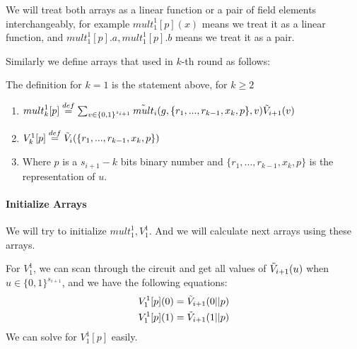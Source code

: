 {	We will treat both arrays as a linear function or a pair of field elements interchangeably, for example ${mult}_1^1[p](x)$ means we treat it as a linear function, and ${mult}_1^1[p].a, {mult}_1^1[p].b$ means we treat it as a pair.
	
	Similarly we define arrays that used in $k$-th round as follows:
	\begin{definition}
		
		The definition for $k=1$ is the statement above, for $k\ge 2$
		\begin{enumerate}
			\item ${mult}_k^1[p]\overset{def}{=}\sum_{v\in \{0, 1\}^{s_{i+1}}}\tilde{mult}_i(g, \{r_1, ..., r_{k-1}, x_k, p\}, v)\tilde{V}_{i+1}(v)$
			\item ${V}_k^1[p]\overset{def}{=}\tilde{V}_i(\{r_1, ..., r_{k-1}, x_k, p\})$
			\item Where $p$ is a $s_{i+1}-k$ bits binary number and $\{r_1, ..., r_{k-1}, x_k, p\}$ is the representation of $u$.
		\end{enumerate}
	\end{definition}
	
	\paragraph{Initialize Arrays}
	We will try to initialize ${mult}_1^1, {V}_1^1$. And we will calculate next arrays using these arrays.
	
	For ${V}_1^1$, we can scan through the circuit and get all values of $\tilde{V}_{i+1}(u)$ when $u \in \{0, 1\}^{s_{i+1}}$, and we have the following equations:
	\begin{align*}
	{V}_1^1[p](0)=\tilde{V}_{i+1}(0||p)\\
	{V}_1^1[p](1)=\tilde{V}_{i+1}(1||p)
	\end{align*}
	We can solve for ${V}_1^1[p]$ easily.
	
}
